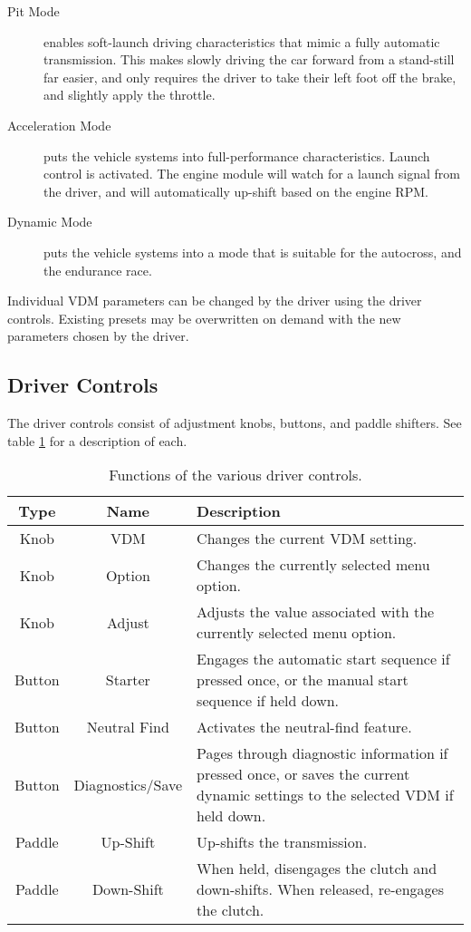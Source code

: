 \begin{description}
  \item [{Pit Mode}] enables soft-launch driving characteristics that mimic a fully automatic transmission. This makes slowly driving the car forward from a stand-still far easier, and only requires the driver to take their left foot off the brake, and slightly apply the throttle.
  \item [{Acceleration Mode}] puts the vehicle systems into full-performance characteristics. Launch control is activated. The engine module will watch for a launch signal from the driver, and will automatically up-shift based on the engine RPM.
  \item [{Dynamic Mode}] puts the vehicle systems into a mode that is suitable for the autocross, and the endurance race.
\end{description}

Individual VDM parameters can be changed by the driver using the driver controls. Existing presets may be overwritten on demand with the new parameters chosen by the driver.

\subsection{Driver Controls}
\label{sec:interface_controls}

The driver controls consist of adjustment knobs, buttons, and paddle shifters. See table \ref{table:driver_controls} for a description of each.

\begin{table}[H]
\caption{Functions of the various driver controls.}
\centering
\begin{tabular}{|c|c|p{8 cm}|}
	\hline 
	Type & Name & Description \\
	\hline
	\hline 
	Knob & VDM & Changes the current VDM setting. \\
	\hline 
	Knob & Option & Changes the currently selected menu option. \\
	\hline
	Knob & Adjust & Adjusts the value associated with the currently selected menu option. \\
	\hline
	Button & Starter & Engages the automatic start sequence if pressed once, or the manual start sequence if held down.\\
	\hline
	Button & Neutral Find & Activates the neutral-find feature. \\
	\hline
	Button & Diagnostics/Save & Pages through diagnostic information if pressed once, or saves the current dynamic settings to the selected VDM if held down.\\		
	\hline 		
	Paddle & Up-Shift & Up-shifts the transmission. \\
	\hline
	Paddle & Down-Shift & When held, disengages the clutch and down-shifts. When released, re-engages the clutch. \\
	\hline
\end{tabular}
\label{table:driver_controls}
\end{table}

